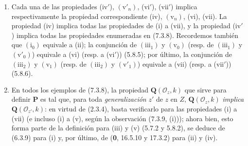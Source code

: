 \begin{remarks}[7.3.9]
\label{IV.2.s7.3.9-fr}
\begin{enumerate}
\item[(i)] Cada una de las propiedades (iv$'$),
$(\mathrm v'_n)$, (vi$'$), (vii$'$) implica respectivamente la
propiedad correspondiente (iv), $(\mathrm v_n)$, (vi), (vii). La
propiedad (iv) implica todas las propiedades de (i) a (vii), y la
propiedad (iv$'$) implica todas las propiedades enumeradas en
(7.3.8). Recordemos también que $(\mathrm i_0)$ equivale a (ii);
la conjunción de $(\mathrm{iii}_1)$ y $(\mathrm v_0)$ (resp. de
$(\mathrm{iii}_1)$ y $(\mathrm v'_0)$) equivale a (vi) (resp. a
(vi$'$)) (5.8.5); por último, la conjunción de $(\mathrm{iii}_2)$
y $(\mathrm v_1)$ (resp. de $(\mathrm{iii}_2)$ y $(\mathrm v'_1)$)
equivale a (vii) (resp. a (vii$'$)) (5.8.6).
\item[(ii)] En todos los ejemplos de (7.3.8), la propiedad
$\boldsymbol Q(\mathscr O_z,k)$ que sirve para definir
$\boldsymbol P$ es tal que, para toda \emph{generalización} $z'$ de
$z$ en $Z$, $\boldsymbol Q(\mathscr O_z,k)$ \emph{implica}
$\boldsymbol Q(\mathscr O_{z'},k)$: en virtud de (2.3.4), basta
verificarlo para las propiedades (i) a (vii) (e incluso (i) a (v),
según la observación (7.3.9, (i))); ahora bien, esto forma parte de
la definición para (iii) y (v) (5.7.2 y 5.8.2), se deduce de (6.3.9)
para (i) y, por último, de (\textbf 0, 16.5.10 y 17.3.2) para (ii) y (iv).
\end{enumerate}
\end{remarks}
